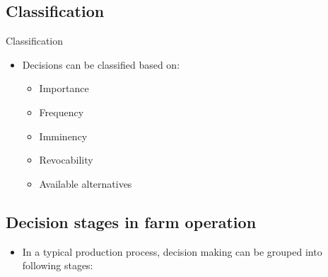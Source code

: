 \documentclass[12pt,ignorenonframetext,aspectratio=169]{beamer}
\providecommand{\tightlist}{%
  \setlength{\itemsep}{0pt}\setlength{\parskip}{0pt}}
\begin{document}
\hypertarget{classification}{%
\subsection{Classification}\label{classification}}

\begin{frame}{Classification}
\protect\hypertarget{classification-1}{}

\begin{itemize}
\tightlist
\item
  Decisions can be classified based on:

  \begin{itemize}
  \tightlist
  \item
    Importance
  \item
    Frequency
  \item
    Imminency
  \item
    Revocability
  \item
    Available alternatives
  \end{itemize}
\end{itemize}

\end{frame}

\hypertarget{decision-stages-in-farm-operation}{%
\subsection{Decision stages in farm
operation}\label{decision-stages-in-farm-operation}}

\small

\begin{itemize}
\tightlist
\item
  In a typical production process, decision making can be grouped into
  following stages:
\end{itemize}
\end{document}

